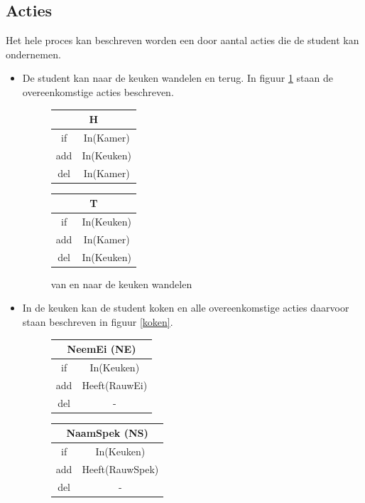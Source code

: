 \documentclass[alternative-exam.tex]{subfiles}
\begin{document}
\subsection{Acties}
Het hele proces kan beschreven worden een door aantal acties die de student kan ondernemen.
\begin{itemize}
\item
De student kan naar de keuken wandelen en terug. In figuur \ref{keuken} staan de overeenkomstige acties beschreven.
\begin{figure}[H]
\centering
\begin{tabular}{|c|c|}
    \multicolumn{2}{c}{H}\\
    \hline
    if & In(Kamer)\\
    \hline
    add & In(Keuken)\\
    \hline
    del & In(Kamer)\\
    \hline
\end{tabular}
\hspace{0.25cm}
\begin{tabular}{|c|c|}
    \multicolumn{2}{c}{T}\\
    \hline
    if & In(Keuken)\\
    \hline
    add & In(Kamer)\\
    \hline
    del & In(Keuken)\\
    \hline
\end{tabular}
\caption{van en naar de keuken wandelen}
\label{keuken}
\end{figure}
\item 
In de keuken kan de student koken en alle overeenkomstige acties daarvoor staan beschreven in figuur \ref{koken}.
\begin{figure}[H]
\centering
\begin{tabular}{|c|c|}
    \multicolumn{2}{c}{NeemEi (NE)}\\
    \hline
    if & In(Keuken)\\
    \hline
    add & Heeft(RauwEi)\\
    \hline
    del & -\\
    \hline
\end{tabular}
\hspace{0.25cm}
\begin{tabular}{|c|c|}
    \multicolumn{2}{c}{NaamSpek (NS)}\\
    \hline
    if & In(Keuken)\\
    \hline
    add & Heeft(RauwSpek)\\
    \hline
    del & -\\

\end{tabular}
\end{figure}
\end{itemize}
\end{document}
